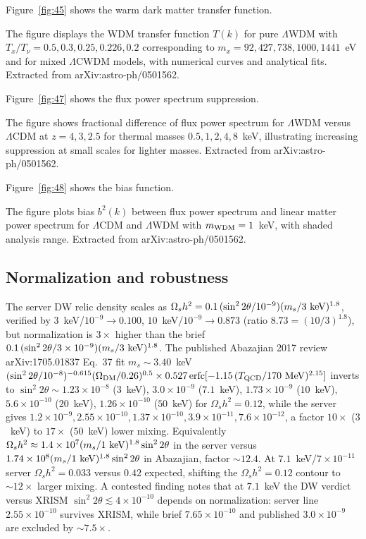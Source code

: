 \documentclass[11pt,a4paper]{article}
\begin{document}
Figure~\ref{fig:45} shows the warm dark matter transfer function.






The figure displays the WDM transfer function $T(k)$ for pure $\Lambda$WDM with $T_{x}/T_{\nu}=0.5,0.3,0.25,0.226,0.2$ corresponding to $m_{x}=92,427,738,1000,1441$~eV and for mixed $\Lambda$CWDM models, with numerical curves and analytical fits. Extracted from arXiv:astro-ph/0501562.

Figure~\ref{fig:47} shows the flux power spectrum suppression.






The figure shows fractional difference of flux power spectrum for $\Lambda$WDM versus $\Lambda$CDM at $z=4,3,2.5$ for thermal masses $0.5,1,2,4,8$~keV, illustrating increasing suppression at small scales for lighter masses. Extracted from arXiv:astro-ph/0501562.

Figure~\ref{fig:48} shows the bias function.






The figure plots bias $b^{2}(k)$ between flux power spectrum and linear matter power spectrum for $\Lambda$CDM and $\Lambda$WDM with $m_{\rm WDM}=1$~keV, with shaded analysis range. Extracted from arXiv:astro-ph/0501562.

\subsection{Normalization and robustness}
The server DW relic density scales as $\Omega_{s}h^{2}=0.1\,(\sin^{2}2\theta/10^{-9})(m_{s}/3~{\rm keV})^{1.8}$, verified by $3$~keV/$10^{-9}\to0.100$, $10$~keV/$10^{-9}\to0.873$ (ratio $8.73=(10/3)^{1.8}$), but normalization is $3\times$ higher than the brief $0.1\,(\sin^{2}2\theta/3\times10^{-9})(m_{s}/3~{\rm keV})^{1.8}$. The published Abazajian 2017 review arXiv:1705.01837 Eq.~37 fit $m_{s}\sim3.40$~keV$(\sin^{2}2\theta/10^{-8})^{-0.615}(\Omega_{\rm DM}/0.26)^{0.5}\times0.527\,{\rm erfc}[-1.15\,(T_{\rm QCD}/170~{\rm MeV})^{2.15}]$ inverts to $\sin^{2}2\theta\sim1.23\times10^{-8}$ ($3$~keV), $3.0\times10^{-9}$ ($7.1$~keV), $1.73\times10^{-9}$ ($10$~keV), $5.6\times10^{-10}$ ($20$~keV), $1.26\times10^{-10}$ ($50$~keV) for $\Omega_{s}h^{2}=0.12$, while the server gives $1.2\times10^{-9},2.55\times10^{-10},1.37\times10^{-10},3.9\times10^{-11},7.6\times10^{-12}$, a factor $10\times$ ($3$~keV) to $17\times$ ($50$~keV) lower mixing. Equivalently $\Omega_{s}h^{2}\approx1.4\times10^{7}(m_{s}/1~{\rm keV})^{1.8}\sin^{2}2\theta$ in the server versus $1.74\times10^{8}(m_{s}/1~{\rm keV})^{1.8}\sin^{2}2\theta$ in Abazajian, factor $\sim12.4$. At $7.1$~keV/$7\times10^{-11}$ server $\Omega_{s}h^{2}=0.033$ versus $0.42$ expected, shifting the $\Omega_{s}h^{2}=0.12$ contour to $\sim12\times$ larger mixing. A contested finding notes that at $7.1$~keV the DW verdict versus XRISM $\sin^{2}2\theta\lesssim4\times10^{-10}$ depends on normalization: server line $2.55\times10^{-10}$ survives XRISM, while brief $7.65\times10^{-10}$ and published $3.0\times10^{-9}$ are excluded by $\sim7.5\times$.
\end{document}
